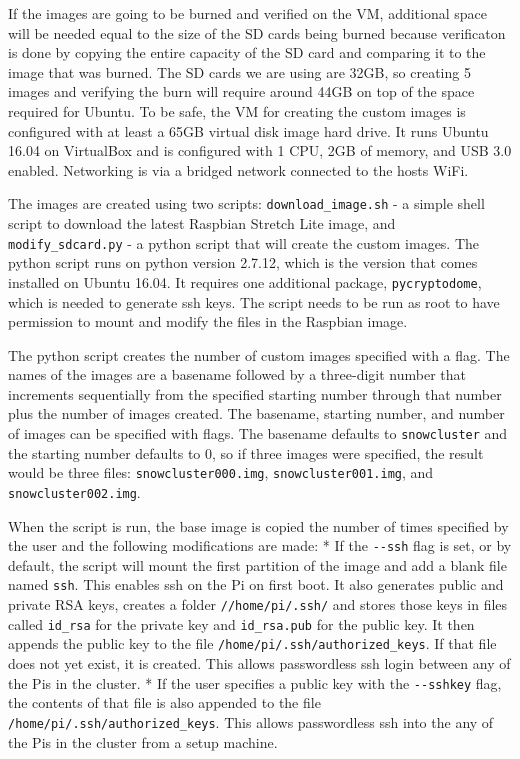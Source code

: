 If the images are going to be burned and verified on the VM,
additional space will be needed equal to the size of the SD cards
being burned because verificaton is done by copying the entire
capacity of the SD card and comparing it to the image that was
burned. The SD cards we are using are 32GB, so creating 5 images and
verifying the burn will require around 44GB on top of the space
required for Ubuntu. To be safe, the VM for creating the custom images
is configured with at least a 65GB virtual disk image hard drive.  It
runs Ubuntu 16.04 on VirtualBox and is configured with 1 CPU, 2GB of
memory, and USB 3.0 enabled. Networking is via a bridged network
connected to the hosts WiFi.

The images are created using two scripts: \verb|download_image.sh| - a
simple shell script to download the latest Raspbian Stretch Lite
image, and \verb|modify_sdcard.py| - a python script that will create
the custom images. The python script runs on python version 2.7.12,
which is the version that comes installed on Ubuntu 16.04. It requires
one additional package, \verb|pycryptodome|, which is needed to
generate ssh keys. The script needs to be run as root to have
permission to mount and modify the files in the Raspbian image.

The python script creates the number of custom images specified with a
flag. The names of the images are a basename followed by a three-digit
number that increments sequentially from the specified starting number
through that number plus the number of images created. The basename,
starting number, and number of images can be specified with flags. The
basename defaults to \verb|snowcluster| and the starting number
defaults to 0, so if three images were specified, the result would be
three files: \verb|snowcluster000.img|, \verb|snowcluster001.img|,
and \verb|snowcluster002.img|.

When the script is run, the base image is copied the number of times
specified by the user and the following modifications are made: * If
the \verb|--ssh| flag is set, or by default, the script will mount the
first partition of the image and add a blank file
named \verb|ssh|. This enables ssh on the Pi on first boot. It also
generates public and private RSA keys, creates a
folder \verb|//home/pi/.ssh/| and stores those keys in files
called \verb|id_rsa| for the private key and \verb|id_rsa.pub| for the
public key. It then appends the public key to the
file \verb|/home/pi/.ssh/authorized_keys|. If that file does not yet
exist, it is created. This allows passwordless ssh login between any
of the Pis in the cluster.  * If the user specifies a public key with
the \verb|--sshkey| flag, the contents of that file is also appended
to the file \verb|/home/pi/.ssh/authorized_keys|. This allows
passwordless ssh into the any of the Pis in the cluster from a setup
machine.

